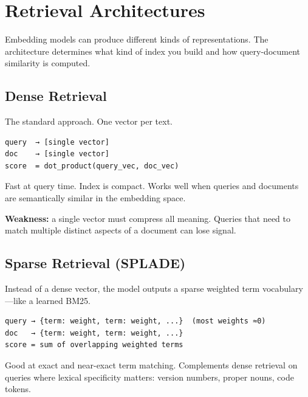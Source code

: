 \chapter{Retrieval Architectures}
\label{ch:retrieval-arch}

Embedding models can produce different kinds of representations. The architecture determines
what kind of index you build and how query-document similarity is computed.

\section{Dense Retrieval}

The standard approach. One vector per text.

\begin{Verbatim}
query  → [single vector]
doc    → [single vector]
score  = dot_product(query_vec, doc_vec)
\end{Verbatim}

Fast at query time. Index is compact. Works well when queries and documents are semantically
similar in the embedding space.

\textbf{Weakness:} a single vector must compress all meaning. Queries that need to match
multiple distinct aspects of a document can lose signal.

\section{Sparse Retrieval (SPLADE)}

Instead of a dense vector, the model outputs a sparse weighted term vocabulary---like a
learned BM25.

\begin{Verbatim}
query → {term: weight, term: weight, ...}  (most weights ≈0)
doc   → {term: weight, term: weight, ...}
score = sum of overlapping weighted terms
\end{Verbatim}

Good at exact and near-exact term matching. Complements dense retrieval on queries where
lexical specificity matters: version numbers, proper nouns, code tokens.

